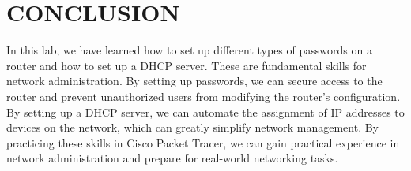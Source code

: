 \documentclass[a4paper,12pt]{article}
\begin{document}
\section*{CONCLUSION}
In this lab, we have learned how to set up different types of passwords on a router and how to set up a DHCP server. These are fundamental skills for network administration. By setting up passwords, we can secure access to the router and prevent unauthorized users from modifying the router's configuration. By setting up a DHCP server, we can automate the assignment of IP addresses to devices on the network, which can greatly simplify network management. By practicing these skills in Cisco Packet Tracer, we can gain practical experience in network administration and prepare for real-world networking tasks.
\end{document}
